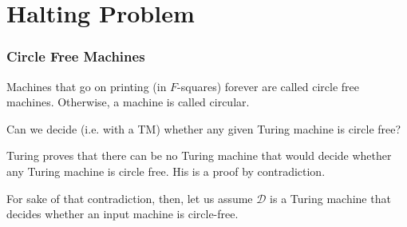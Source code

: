\documentclass{beamer}
\begin{document}
\section{Halting Problem}
\begin{frame}
	\frametitle{Circle Free Machines}

	Machines that go on printing (in $F$-squares) forever are called circle free machines. Otherwise, a machine is called circular. 

	\vspace{0.3cm}

	Can we decide (i.e. with a TM) whether any given Turing machine is circle free?

	\vspace{0.3cm}

	Turing proves that there can be no Turing machine that would decide whether any Turing machine is circle free. His is a proof by contradiction. 
	
	\vspace{0.3cm}
	
	For sake of that contradiction, then, let us assume $\mathcal{D}$ is a Turing machine that decides whether an input machine is circle-free.

	\vspace{2cm}

\end{frame}
\end{document}
